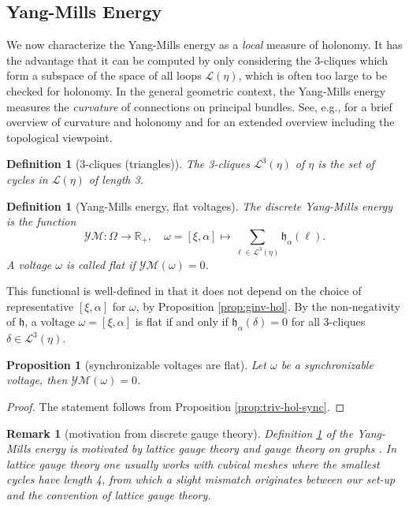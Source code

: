 \documentclass[10pt,reqno]{amsart}
\numberwithin{equation}{section}
\theoremstyle{bfnote}
\newtheorem{proposition}[theorem]{Proposition}
\theoremstyle{bfdef}
\newtheorem{definition}[theorem]{Definition}
\newtheorem{remark}[theorem]{Remark}
\newcommand{\mc}[1]{\mathcal{#1}}
\newcommand{\R}{\mathbb{R}}
\providecommand\gt; %
\renewcommand{\gt}{\xi}
\providecommand\a; %
\renewcommand{\a}{\alpha}
\providecommand\Lps; %
\renewcommand{\Lps}{\mc{L}}
\providecommand\hol; %
\renewcommand{\hol}{\mathfrak{h}}
\begin{document}
\subsection{Yang-Mills Energy}
	We now characterize the Yang-Mills energy as a \textit{local} measure of holonomy. It has the advantage that it can be computed by only considering the 3-cliques which form a subspace of the space of all loops $\Lps(\eta)$, which is often too large to be checked for holonomy. In the general geometric context, the Yang-Mills energy measures the \textit{curvature} of connections on principal bundles. See, e.g., \cite[Section 10]{Petersen:2016aa} for a brief overview of curvature and holonomy and \cite[Sections 12,13] {Berger:2003aa} for an extended overview including the topological viewpoint.

	\begin{definition}[3-cliques (triangles)]
		The \textit{3-cliques $\Lps^3(\eta)$} of $\eta$ is the set of cycles in $\Lps(\eta)$ of length 3.
	\end{definition}

	\begin{definition}[Yang-Mills energy, flat voltages]\label{def:ym-flat}
		The \textit{discrete Yang-Mills energy} is the function
		\begin{equation}
			\mc{YM} : \Omega \to \R_{+}, \quad \omega = [\gt,\a] \mapsto \sum_{\ell \in \Lps^{3}(\eta)} \hol_{\a}(\ell).
		\end{equation}
		A voltage $\omega$ is called \textit{flat} if $\mc{YM}(\omega) = 0$.
	\end{definition}
	This functional is well-defined in that it does not depend on the choice of representative $[\xi,\alpha]$ for $\omega$, by Proposition \ref{prop:ginv-hol}.
	By the non-negativity of $\hol$, a voltage $\omega = [\xi,\alpha]$ is flat if and only if $\hol_{\alpha}(\delta) = 0$ for all 3-cliques $\delta \in \mc{L}^{3}(\eta)$.


	\begin{proposition}[synchronizable voltages are flat]\label{prop:synch-flat}
		Let $\omega$ be a synchronizable voltage, then $\mc{YM}(\omega) = 0$.
	\end{proposition}
	\begin{proof}
		The statement follows from Proposition \ref{prop:triv-hol-sync}.
	\end{proof}

	\begin{remark}[motivation from discrete gauge theory]
		Definition \ref{def:ym-flat} of the Yang-Mills energy is motivated by \textit{lattice gauge theory} \cite{Gattringer:2010zz} and \textit{gauge theory on graphs} \cite{baezSpinNetworkStates1996,jiangGaugeTheoryGraphs2023}. In lattice gauge theory one usually works with cubical meshes where the smallest cycles have length 4, from which a slight mismatch originates between our set-up and the convention of lattice gauge theory.
	\end{remark}
\end{document}
